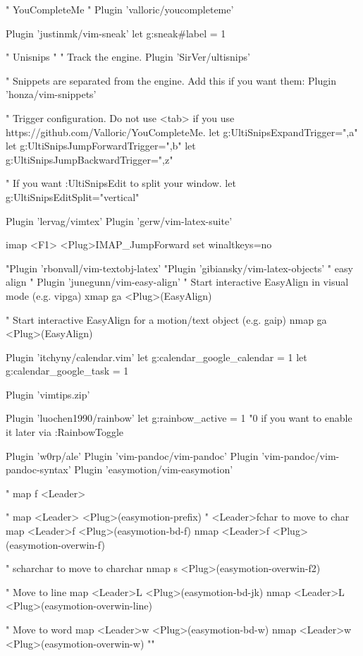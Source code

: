 " YouCompleteMe
" 
Plugin 'valloric/youcompleteme'

Plugin 'justinmk/vim-sneak'
let g:sneak#label = 1


" Unisnips
" 
" Track the engine.
Plugin 'SirVer/ultisnips'

" Snippets are separated from the engine. Add this if you want them:
Plugin 'honza/vim-snippets'

" Trigger configuration. Do not use <tab> if you use https://github.com/Valloric/YouCompleteMe.
let g:UltiSnipsExpandTrigger=",a"
let g:UltiSnipsJumpForwardTrigger=",b"
let g:UltiSnipsJumpBackwardTrigger=",z"




" If you want :UltiSnipsEdit to split your window.
let g:UltiSnipsEditSplit="vertical"

Plugin 'lervag/vimtex'
Plugin 'gerw/vim-latex-suite'

imap <F1>  <Plug>IMAP_JumpForward
set winaltkeys=no

"Plugin 'rbonvall/vim-textobj-latex'
"Plugin 'gibiansky/vim-latex-objects'
" easy align 
"
Plugin 'junegunn/vim-easy-align'
" Start interactive EasyAlign in visual mode (e.g. vipga)
xmap ga <Plug>(EasyAlign)

" Start interactive EasyAlign for a motion/text object (e.g. gaip)
nmap ga <Plug>(EasyAlign)


Plugin 'itchyny/calendar.vim'
let g:calendar_google_calendar = 1
let g:calendar_google_task = 1



Plugin 'vimtips.zip'

Plugin 'luochen1990/rainbow'
let g:rainbow_active = 1 "0 if you want to enable it later via :RainbowToggle

Plugin 'w0rp/ale'
Plugin 'vim-pandoc/vim-pandoc'
Plugin 'vim-pandoc/vim-pandoc-syntax' 
Plugin 'easymotion/vim-easymotion'

" map f <Leader> 

" map <Leader> <Plug>(easymotion-prefix)
" <Leader>f{char} to move to {char}
map  <Leader>f <Plug>(easymotion-bd-f)
nmap <Leader>f <Plug>(easymotion-overwin-f)

" s{char}{char} to move to {char}{char}
nmap s <Plug>(easymotion-overwin-f2)

" Move to line
map <Leader>L <Plug>(easymotion-bd-jk)
nmap <Leader>L <Plug>(easymotion-overwin-line)

" Move to word
map  <Leader>w <Plug>(easymotion-bd-w)
nmap <Leader>w <Plug>(easymotion-overwin-w)
""



